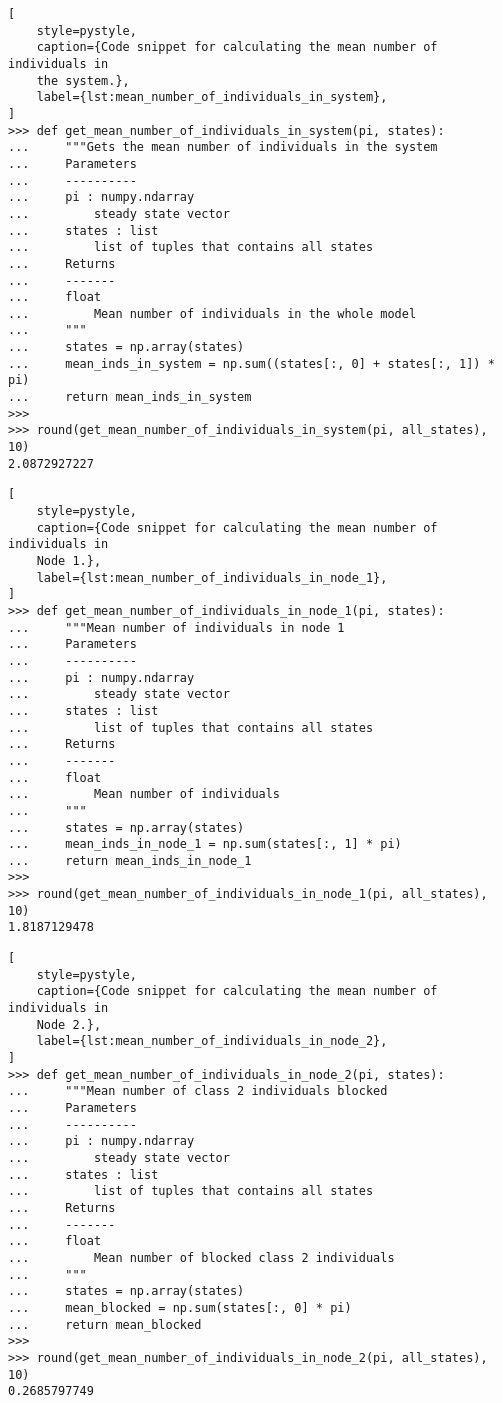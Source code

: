\begin{lstlisting}[
    style=pystyle,
    caption={Code snippet for calculating the mean number of individuals in
    the system.},
    label={lst:mean_number_of_individuals_in_system},
]
>>> def get_mean_number_of_individuals_in_system(pi, states):
...     """Gets the mean number of individuals in the system
...     Parameters
...     ----------
...     pi : numpy.ndarray
...         steady state vector
...     states : list
...         list of tuples that contains all states
...     Returns
...     -------
...     float
...         Mean number of individuals in the whole model
...     """
...     states = np.array(states)
...     mean_inds_in_system = np.sum((states[:, 0] + states[:, 1]) * pi)
...     return mean_inds_in_system
>>>
>>> round(get_mean_number_of_individuals_in_system(pi, all_states), 10)
2.0872927227

\end{lstlisting}

\begin{lstlisting}[
    style=pystyle,
    caption={Code snippet for calculating the mean number of individuals in
    Node 1.},
    label={lst:mean_number_of_individuals_in_node_1},
]
>>> def get_mean_number_of_individuals_in_node_1(pi, states):
...     """Mean number of individuals in node 1
...     Parameters
...     ----------
...     pi : numpy.ndarray
...         steady state vector
...     states : list
...         list of tuples that contains all states
...     Returns
...     -------
...     float
...         Mean number of individuals
...     """
...     states = np.array(states)
...     mean_inds_in_node_1 = np.sum(states[:, 1] * pi)
...     return mean_inds_in_node_1
>>>
>>> round(get_mean_number_of_individuals_in_node_1(pi, all_states), 10)
1.8187129478

\end{lstlisting}

\begin{lstlisting}[
    style=pystyle,
    caption={Code snippet for calculating the mean number of individuals in
    Node 2.},
    label={lst:mean_number_of_individuals_in_node_2},
]
>>> def get_mean_number_of_individuals_in_node_2(pi, states):
...     """Mean number of class 2 individuals blocked
...     Parameters
...     ----------
...     pi : numpy.ndarray
...         steady state vector
...     states : list
...         list of tuples that contains all states
...     Returns
...     -------
...     float
...         Mean number of blocked class 2 individuals
...     """
...     states = np.array(states)
...     mean_blocked = np.sum(states[:, 0] * pi)
...     return mean_blocked
>>>
>>> round(get_mean_number_of_individuals_in_node_2(pi, all_states), 10)
0.2685797749

\end{lstlisting}


